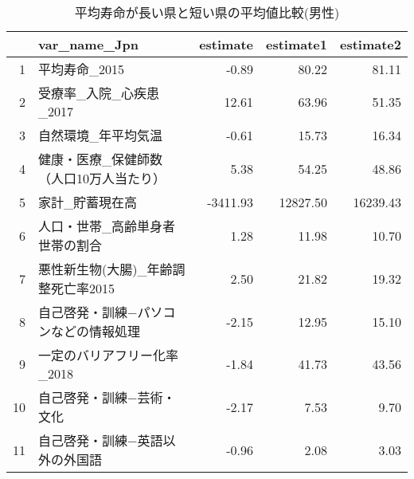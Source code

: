 \begin{table}[ht]
\centering
\caption{平均寿命が長い県と短い県の平均値比較(男性)}
\label{LE_Ttest_d_m.tex}
\begingroup\tiny

\begin{adjustbox}{width=.7\textwidth}
\begin{tabular}{rlrrr}
  \hline
 & var\_name\_Jpn & estimate & estimate1 & estimate2 \\
  \hline
1 & 平均寿命\_2015 & -0.89 & 80.22 & 81.11 \\
  2 & 受療率\_入院\_心疾患\_2017 & 12.61 & 63.96 & 51.35 \\
  3 & 自然環境\_年平均気温 & -0.61 & 15.73 & 16.34 \\
  4 & 健康・医療\_保健師数（人口10万人当たり） & 5.38 & 54.25 & 48.86 \\
  5 & 家計\_貯蓄現在高 & -3411.93 & 12827.50 & 16239.43 \\
  6 & 人口・世帯\_高齢単身者世帯の割合 & 1.28 & 11.98 & 10.70 \\
  7 & 悪性新生物(大腸)\_年齢調整死亡率2015 & 2.50 & 21.82 & 19.32 \\
  8 & 自己啓発・訓練−パソコンなどの情報処理 & -2.15 & 12.95 & 15.10 \\
  9 & 一定のバリアフリー化率\_2018 & -1.84 & 41.73 & 43.56 \\
  10 & 自己啓発・訓練−芸術・文化 & -2.17 & 7.53 & 9.70 \\
  11 & 自己啓発・訓練−英語以外の外国語 & -0.96 & 2.08 & 3.03 \\
   \hline
\end{tabular}
\end{adjustbox}

\endgroup
\end{table}
